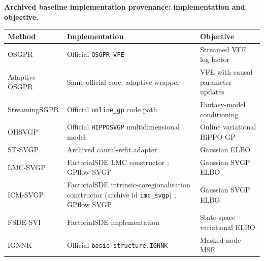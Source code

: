 \begin{table}[H]
\centering
{\small\bfseries Archived baseline implementation provenance: implementation and objective.}\par\smallskip
\small
\setlength{\tabcolsep}{5pt}
\renewcommand{\arraystretch}{1.18}
\begin{tabularx}{\textwidth}{@{}>{\raggedright\arraybackslash}p{}>{\raggedright\arraybackslash}p{}>{\raggedright\arraybackslash}X@{}}
\toprule
Method & Implementation & Objective \\
\midrule
OSGPR & Official \texttt{OSGPR\_VFE} \citep{Bui2017} & Streamed VFE log factor \\
Adaptive OSGPR & Same official core; adaptive wrapper & VFE with causal parameter updates \\
StreamingSGPR & Official \texttt{online\_gp} code path \citep{Maddox2021} & Fantasy-model conditioning \\
OHSVGP & Official \texttt{HIPPOSVGP} multidimensional model \citep{Chen2025} & Online variational HiPPO GP \\
ST-SVGP & Archived causal-refit adapter \citep{Hamelijnck2021} & Gaussian ELBO \\
LMC-SVGP & FactorialSDE LMC constructor \citep{Jeong2023}; GPflow SVGP \citep{Hensman2015} & Gaussian SVGP ELBO \\
ICM-SVGP & FactorialSDE intrinsic-coregionalisation constructor (archive id \texttt{imc\_svgp}) \citep{Jeong2023}; GPflow SVGP \citep{Hensman2015} & Gaussian SVGP ELBO \\
FSDE-SVI & FactorialSDE implementation \citep{Jeong2023} & State-space variational ELBO \\
IGNNK & Official \texttt{basic\_structure.IGNNK} \citep{Wu2021IGNNK} & Masked-node MSE \\
\bottomrule
\end{tabularx}
\end{table}

